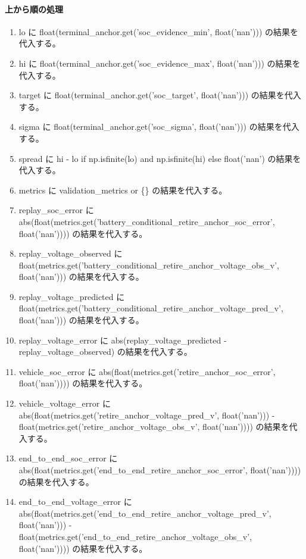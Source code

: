 \documentclass[a4paper,11pt]{article}
\begin{document}
            \paragraph{上から順の処理}
            \begin{enumerate}[leftmargin=1.8em]
            \item lo に float(terminal\_anchor.get('soc\_evidence\_min', float('nan'))) の結果を代入する。
\item hi に float(terminal\_anchor.get('soc\_evidence\_max', float('nan'))) の結果を代入する。
\item target に float(terminal\_anchor.get('soc\_target', float('nan'))) の結果を代入する。
\item sigma に float(terminal\_anchor.get('soc\_sigma', float('nan'))) の結果を代入する。
\item spread に hi - lo if np.isfinite(lo) and np.isfinite(hi) else float('nan') の結果を代入する。
\item metrics に validation\_metrics or \{\} の結果を代入する。
\item replay\_soc\_error に abs(float(metrics.get('battery\_conditional\_retire\_anchor\_soc\_error', float('nan')))) の結果を代入する。
\item replay\_voltage\_observed に float(metrics.get('battery\_conditional\_retire\_anchor\_voltage\_obs\_v', float('nan'))) の結果を代入する。
\item replay\_voltage\_predicted に float(metrics.get('battery\_conditional\_retire\_anchor\_voltage\_pred\_v', float('nan'))) の結果を代入する。
\item replay\_voltage\_error に abs(replay\_voltage\_predicted - replay\_voltage\_observed) の結果を代入する。
\item vehicle\_soc\_error に abs(float(metrics.get('retire\_anchor\_soc\_error', float('nan')))) の結果を代入する。
\item vehicle\_voltage\_error に abs(float(metrics.get('retire\_anchor\_voltage\_pred\_v', float('nan'))) - float(metrics.get('retire\_anchor\_voltage\_obs\_v', float('nan')))) の結果を代入する。
\item end\_to\_end\_soc\_error に abs(float(metrics.get('end\_to\_end\_retire\_anchor\_soc\_error', float('nan')))) の結果を代入する。
\item end\_to\_end\_voltage\_error に abs(float(metrics.get('end\_to\_end\_retire\_anchor\_voltage\_pred\_v', float('nan'))) - float(metrics.get('end\_to\_end\_retire\_anchor\_voltage\_obs\_v', float('nan')))) の結果を代入する。

\end{enumerate}
\end{document}
